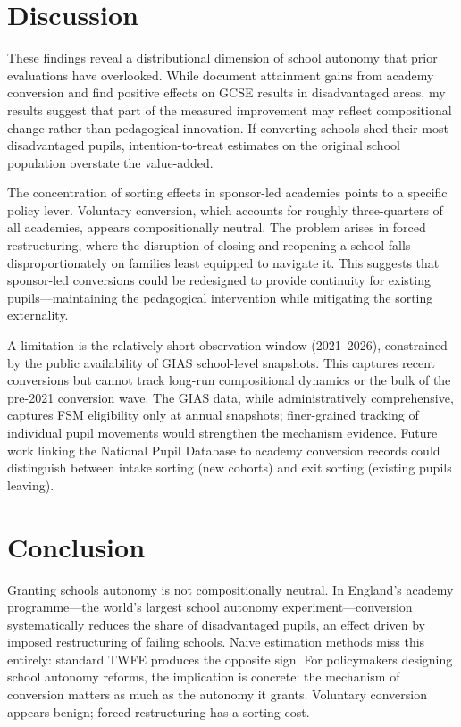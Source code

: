 \documentclass[12pt]{article}
\begin{document}
\section{Discussion}

These findings reveal a distributional dimension of school autonomy that prior evaluations have overlooked. While \citet{eyles2016} document attainment gains from academy conversion and \citet{andrews2017} find positive effects on GCSE results in disadvantaged areas, my results suggest that part of the measured improvement may reflect compositional change rather than pedagogical innovation. If converting schools shed their most disadvantaged pupils, intention-to-treat estimates on the original school population overstate the value-added.

The concentration of sorting effects in sponsor-led academies points to a specific policy lever. Voluntary conversion, which accounts for roughly three-quarters of all academies, appears compositionally neutral. The problem arises in forced restructuring, where the disruption of closing and reopening a school falls disproportionately on families least equipped to navigate it. This suggests that sponsor-led conversions could be redesigned to provide continuity for existing pupils---maintaining the pedagogical intervention while mitigating the sorting externality.

A limitation is the relatively short observation window (2021--2026), constrained by the public availability of GIAS school-level snapshots. This captures recent conversions but cannot track long-run compositional dynamics or the bulk of the pre-2021 conversion wave. The GIAS data, while administratively comprehensive, captures FSM eligibility only at annual snapshots; finer-grained tracking of individual pupil movements would strengthen the mechanism evidence. Future work linking the National Pupil Database to academy conversion records could distinguish between intake sorting (new cohorts) and exit sorting (existing pupils leaving).

\section{Conclusion}

Granting schools autonomy is not compositionally neutral. In England's academy programme---the world's largest school autonomy experiment---conversion systematically reduces the share of disadvantaged pupils, an effect driven by imposed restructuring of failing schools. Naive estimation methods miss this entirely: standard TWFE produces the opposite sign. For policymakers designing school autonomy reforms, the implication is concrete: the mechanism of conversion matters as much as the autonomy it grants. Voluntary conversion appears benign; forced restructuring has a sorting cost.
\end{document}
